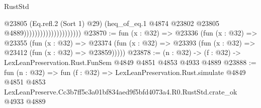 \begin{lexlean}{RustStd}
\begin{coremodule}
                                            @23805
                                            (Eq.refl.{2} (Sort 1) @29)
                                            (heq_of_eq.{1}
                                              @4874
                                              @23802
                                              @23805
                                              @4889)))))))))))))))))))))
@23870 := fun (x : @32) =>
  @23336
    (fun (x : @32) =>
    @23355
      (fun (x : @32) =>
      @23374 (fun (x : @32) => @23393 (fun (x : @32) => @23412 (fun (x : @32) => @23859)))))
@23878 := (n : @32) -> (f : @32) -> LexLeanPreservation.Rust.FunSem @4849 @4851 @4853 @4933 @4889
@23888 := fun (n : @32) =>
  fun (f : @32) =>
  LexLeanPreservation.Rust.simulate
    @4849
    @4851
    @4853
    LexLeanPreserve.Cc3b7ff5c3a01bf834aed9f5bfd4073a4.R0.RustStd.crate_ok
    @4933
    @4889
\end{coremodule}
\end{lexlean}
